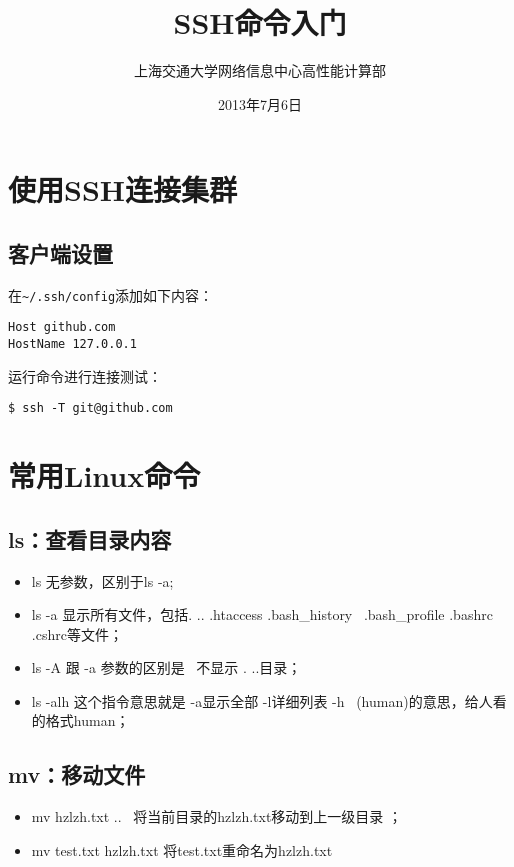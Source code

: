 \documentclass[cs4size, a4paper]{hpcmanual}
\title{SSH命令入门}
\author{上海交通大学网络信息中心高性能计算部}
\date{2013年7月6日}
\begin{document}
\maketitle

\tableofcontents

\section{使用SSH连接集群}

\subsection{客户端设置}

在\texttt{\textasciitilde{}/.ssh/config}添加如下内容：

\begin{verbatim}
Host github.com
HostName 127.0.0.1
\end{verbatim}

运行命令进行连接测试：

\begin{verbatim}
$ ssh -T git@github.com
\end{verbatim}

\section{常用Linux命令}

\subsection{ls：查看目录内容}

\begin{itemize}
\itemsep1pt\parskip0pt
\item
  ls 无参数，区别于ls -a;
\item
  ls -a 显示所有文件，包括. .. .htaccess .bash\_history~ .bash\_profile
  .bashrc .cshrc等文件；
\item
  ls -A 跟 -a 参数的区别是~ 不显示 . ..目录；
\item
  ls -alh 这个指令意思就是 -a显示全部 -l详细列表 -h~
  (human)的意思，给人看的格式human；
\end{itemize}

\subsection{mv：移动文件}

\begin{itemize}
\itemsep1pt\parskip0pt
\item
  mv hzlzh.txt ..~ 将当前目录的hzlzh.txt移动到上一级目录 ；
\item
  mv test.txt hzlzh.txt 将test.txt重命名为hzlzh.txt
\end{itemize}
\end{document}

